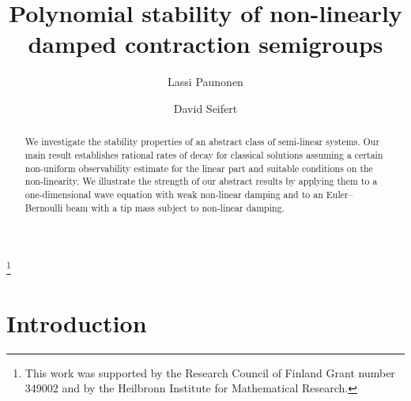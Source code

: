 \documentclass[11pt, a4paper]{amsart}
\theoremstyle{definition}
\numberwithin{equation}{section}
\begin{document}
\title[Polynomial stability of non-linear semigroups]{Polynomial stability of non-linearly damped contraction semigroups}

\author[L.~Paunonen]{Lassi Paunonen}
\address[L.~Paunonen]{Mathematics Research Centre, Tampere University, P.O.~Box 692, 33101 Tampere, Finland}
 
\author[D. Seifert]{David Seifert}
\address[D. Seifert]{School of Mathematics, Statistics and Physics, Newcastle University, Herschel Building, Newcastle upon Tyne, NE1 7RU, United Kingdom}

\begin{abstract}
We investigate the stability properties of an abstract class of semi-linear systems. Our main result establishes rational rates of decay for classical solutions assuming a certain non-uniform observability estimate for the linear part and suitable conditions on the non-linearity. We illustrate the strength of our abstract results by applying them to a one-dimensional wave equation with weak non-linear damping and to an Euler--Bernoulli beam with a tip mass subject to non-linear damping.
\end{abstract}



\thanks{This work was supported by the Research Council of Finland Grant number 349002 and by the Heilbronn Institute for Mathematical Research.}

\maketitle


\section{Introduction}\label{sec:int}
\end{document}
